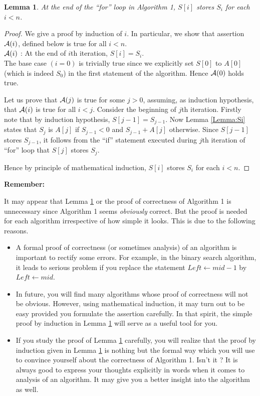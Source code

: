 \documentclass[11pt]{article}
\newtheorem{lemma}[theorem]{Lemma}
\begin{document}
\begin{lemma}
At the end of the ``for'' loop in Algorithm 1, $S[i]$ stores $S_i$ for each $i<n$.
\label{Lemma:correct}
\end{lemma}
\begin{proof}
We give a proof by induction of $i$. In particular, we show that assertion
${\cal A}(i)$, defined below is true for all $i<n$.\\
${\cal A}(i)$ : At the end of $i$th iteration, $S[i]=S_i$. \\
\noindent
The base case $(i=0)$ is trivially true since we explicitly set $S[0]$
to $A[0]$ (which is indeed $S_0$) in the first statement of the algorithm.
Hence ${\cal A}(0)$ holds true.

Let us prove that ${\cal A}(j)$ is true for some $j>0$, assuming, as induction
hypothesis, that ${\cal A}(i)$ is true for all $i<j$.
Consider the beginning of $j$th iteration. Firstly note that by induction
hypothesis, $S[j-1]=S_{j-1}$. Now Lemma \ref{Lemma:Si} states that $S_j$
is $A[j]$ if $S_{j-1}<0$ and $S_{j-1}+A[j]$ otherwise. Since $S[j-1]$ stores
$S_{j-1}$, it follows from the ``if'' statement executed during $j$th iteration
of ``for'' loop that $S[j]$ stores $S_j$.

Hence by principle of mathematical induction, $S[i]$ stores $S_i$ for
each $i<n$.
\end{proof}

\begin{large}\textbf{Remember:}\end{large}
It may appear that Lemma \ref{Lemma:correct} or the proof of correctness
of Algorithm 1 is unnecessary since Algorithm 1 seems {\em obviously} correct.
But the proof is needed for each algorithm irrespective of how simple it looks.
This is due to the following reasons.
\begin{itemize}
\item
A formal proof of correctness (or sometimes analysis) of an algorithm
is important to rectify some errors. For example, in the binary search
algorithm, it leads to serious problem if you replace the statement
$Left \leftarrow mid-1$ by $Left\leftarrow mid$.
\item
In future, you will find many algorithms whose proof of correctness will not
be obvious. However, using mathematical induction, it may turn out to be
easy provided you formulate the assertion carefully. In that spirit, the
simple proof by induction in Lemma \ref{Lemma:correct} will serve as a useful
tool for you.
\item If you study the proof of Lemma \ref{Lemma:correct} carefully, you will
realize that the proof by induction given in Lemma \ref{Lemma:correct} is
nothing but the formal way which you will use to convince yourself about the
correctness  of Algorithm 1. Isn't it ? It is always good to express your
thoughts explicitly in words when it comes to analysis of an algorithm.
It may give you a better insight into the algorithm as well.
\end{itemize}
\end{document}
